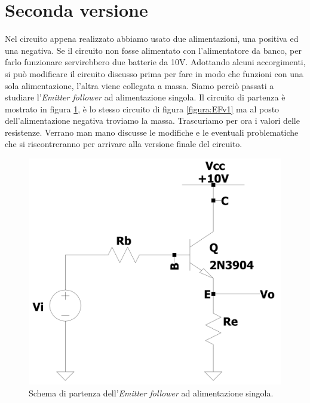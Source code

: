 \documentclass{report}
\begin{document}
\section{Seconda versione} %
\label{EFv2cap}
Nel circuito appena realizzato abbiamo usato due alimentazioni, una positiva ed una negativa. Se il circuito non fosse alimentato con l'alimentatore da banco, per farlo funzionare servirebbero due batterie da 10V. Adottando alcuni accorgimenti, si può modificare il circuito discusso prima per fare in modo che funzioni con una sola alimentazione, l'altra viene collegata a massa. Siamo perciò passati a studiare l'\textit{Emitter follower} ad alimentazione singola. Il circuito di partenza è mostrato in figura \ref{figura:EFv2_1}, è lo stesso circuito di figura \ref{figura:EFv1} ma al posto dell'alimentazione negativa troviamo la massa. Trascuriamo per ora i valori delle resistenze. Verrano man mano discusse le modifiche e le eventuali problematiche che si riscontreranno per arrivare alla versione finale del circuito.
\begin{figure}[h]
\centering
\includegraphics[height=10cm]{immagini/EFv2_1}
\caption{Schema di partenza dell'\textit{Emitter follower} ad alimentazione singola.}
\label{figura:EFv2_1}
\end{figure}
\end{document}

